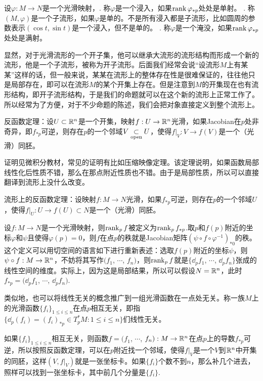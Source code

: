 \para 设$\varphi:M\to N$是一个光滑映射，. 称$\varphi$是一个浸入，如果$\operatorname{rank} \varphi_{*p}$处处是单射。 . 称$(M,\varphi)$是一个子流形，如果$\varphi$是单的。不是所有浸入都是子流形，比如圆周的参数表示$(\cos t,\sin t)$是一个浸入，但不是单的。 . 称$\varphi$是一个淹没，如果$\operatorname{rank} \varphi_{*p}$处处是满射。

显然，对于光滑流形的一个开子集，他可以继承大流形的流形结构而形成一个新的流形，他是一个子流形，被称为开子流形。后面我们经常会说“设流形$M$上有某某”这样的话，但一般来说，某某在流形上的整体存在性是很难保证的，往往他只是局部存在，即可以在流形$M$的某个开集上存在。但是注意到$M$的开集现在也有流形结构，即开子流形结构，于是我们的命题就可以在这个新的流形上正常工作了。所以经常为了方便，对于不少命题的陈述，我们会把对象直接定义到整个流形上。

\para 反函数定理：设$U\subset \mathbb{R}^n$是一个开集，映射$f:U\to \mathbb{R}^n$光滑，如果Jacobian在$p$处非奇异，即$f_{*p}$可逆，则存在$p$的一个邻域$V\underset{\mathrm{open}}{\subset} U$，使得$f|_V:V\to f(V)$是一个（光滑）同胚。

证明见微积分教材，常见的证明有比如压缩映像定理。该定理说明，如果函数局部线性化后性质不错，那么在那点附近性质也不错。由于是局部性质，所以可以直接翻译到流形上没什么改变。

\theo 流形上的反函数定理：设映射$f:M\to N$光滑，如果$f_{*p}$可逆，则存在$p$的一个邻域$U$，使得$f|_U:U\to f(U)\subset N$是一个（光滑）同胚。

\para 设$f:M\to N$是一个光滑映射，则$\operatorname{rank}_p f$被定义为$\operatorname{rank}_p f_{*p}$.取$p$和$f(p)$附近的坐标$\varphi$和$\psi$且使得$\varphi(p)=0$，则$f$在点$p$的秩就是Jacobian矩阵$(\psi\circ f \circ \varphi^{-1})_{*0}$的秩。这个定义可以用切空间的语言如下进行重新表述：选取$f(p)$附近的坐标$\psi$，则$\psi\circ f:M\to \mathbb{R}^n$，不妨将其写作$(f_1$, $\cdots$, $f_n)$，则$\operatorname{rank}_p f$就是$\{\dd_pf_1$, $\cdots$, $\dd_pf_n\}$张成的线性空间的维度。实际上，因为这是局部结果，所以可以假设$N=\mathbb{R}^n$，此时$f_{*p}=(\dd_pf_1$, $\cdots$, $\dd_pf_n)$.

类似地，也可以将线性无关的概念推广到一组光滑函数在一点处无关。称一族$M$上的光滑函数$\{f_i\}_{1\leq i\leq n}$在点$p$相互无关，即指$\{\dd_p (f_i)=(f_i)_{*p}\in T_p^*M:1\leq i\leq n\}$们线性无关。

如果$\{f_i\}_{1\leq i\leq n}$相互无关，则函数$f=(f_1$, $\cdots$, $f_n):M\to \mathbb{R}^n$在点$p$上的导数$f_{*p}$可逆，所以按照反函数定理，可以在$p$附近找一个邻域，使得$f|_V$是一个$V$到$\mathbb{R}^n$中开集的同胚，这样$(V,f|_V)$就是一张坐标卡。如果$\{f_i\}$个数不到$n$，那么补几个进去，照样可以找到一张坐标卡，其中前几个分量是$\{f_i\}$.

